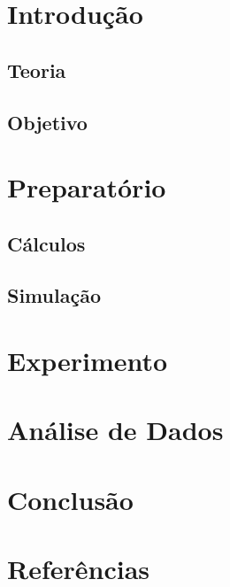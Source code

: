 \documentclass[a4paper]{article}
\begin{document}

\newpage

\Large\tableofcontents
\thispagestyle{empty}
\newpage
{}
\large
\section{Introdução}
\subsection{Teoria}
\subsection{Objetivo}

\section{Preparatório}
\subsection{Cálculos}
\subsection{Simulação}

\section{Experimento}

\section{Análise de Dados}

\section{Conclusão}

\section{Referências}
\end{document}
